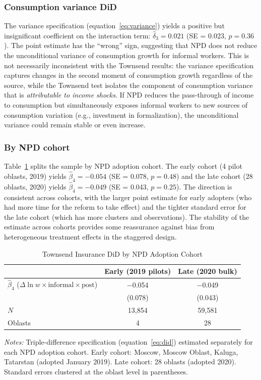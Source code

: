 \documentclass[12pt]{article}
\begin{document}
\subsubsection{Consumption variance DiD}

The variance specification (equation~\ref{eq:variance}) yields a positive but insignificant coefficient on the interaction term: $\hat{\delta}_3 = 0.021$ (SE = 0.023, $p = 0.36$). The point estimate has the ``wrong'' sign, suggesting that NPD does not reduce the unconditional variance of consumption growth for informal workers. This is not necessarily inconsistent with the Townsend results: the variance specification captures changes in the second moment of consumption growth regardless of the source, while the Townsend test isolates the component of consumption variance that is \textit{attributable to income shocks}. If NPD reduces the pass-through of income to consumption but simultaneously exposes informal workers to new sources of consumption variation (e.g., investment in formalization), the unconditional variance could remain stable or even increase.

\subsubsection{By NPD cohort}

Table~\ref{tab:did_cohort} splits the sample by NPD adoption cohort. The early cohort (4 pilot oblasts, 2019) yields $\hat{\beta}_4 = -0.054$ (SE = 0.078, $p = 0.48$) and the late cohort (28 oblasts, 2020) yields $\hat{\beta}_4 = -0.049$ (SE = 0.043, $p = 0.25$). The direction is consistent across cohorts, with the larger point estimate for early adopters (who had more time for the reform to take effect) and the tighter standard error for the late cohort (which has more clusters and observations). The stability of the estimate across cohorts provides some reassurance against bias from heterogeneous treatment effects in the staggered design.

\begin{table}[htbp]
\centering
\caption{Townsend Insurance DiD by NPD Adoption Cohort}
\label{tab:did_cohort}
\small
\begin{tabular}{lcc}
\toprule
 & Early (2019 pilots) & Late (2020 bulk) \\
\midrule
$\hat{\beta}_4$ ($\Delta \ln w \times \text{informal} \times \text{post}$) & $-$0.054 & $-$0.049 \\
 & (0.078) & (0.043) \\[4pt]
$N$ & 13,854 & 59,581 \\
Oblasts & 4 & 28 \\
\bottomrule
\end{tabular}
\begin{minipage}{0.9\textwidth}
\vspace{0.3em}
\footnotesize \textit{Notes:} Triple-difference specification (equation~\ref{eq:did}) estimated separately for each NPD adoption cohort. Early cohort: Moscow, Moscow Oblast, Kaluga, Tatarstan (adopted January 2019). Late cohort: 28 oblasts (adopted 2020). Standard errors clustered at the oblast level in parentheses.
\end{minipage}
\end{table}
\end{document}
